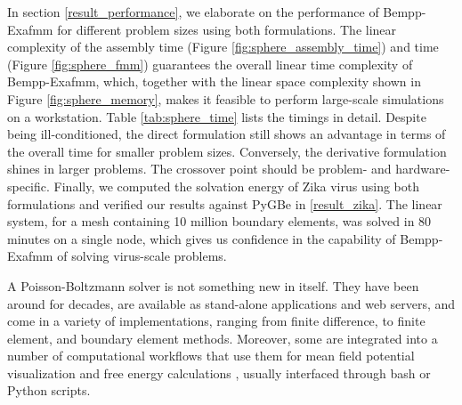 In section \ref{result_performance}, we elaborate on the performance of Bempp-Exafmm for different problem sizes using both formulations.
The linear complexity of the assembly time (Figure \ref{fig:sphere_assembly_time}) and \fmm time (Figure \ref{fig:sphere_fmm}) guarantees the overall linear time complexity of Bempp-Exafmm, which, together with the linear space complexity shown in Figure \ref{fig:sphere_memory}, makes it feasible to perform large-scale simulations on a workstation.
Table \ref{tab:sphere_time} lists the timings in detail.
Despite being ill-conditioned, the direct formulation still shows an advantage in terms of the overall time for smaller problem sizes.
Conversely, the derivative formulation shines in larger problems.
The crossover point should be problem- and hardware-specific.
Finally, we computed the solvation energy of Zika virus using both formulations and verified our results against PyGBe in \ref{result_zika}.
The linear system, for a mesh containing 10 million boundary elements, was solved in 80 minutes on a single node, which gives us confidence in the capability of Bempp-Exafmm of solving virus-scale problems.


A Poisson-Boltzmann solver is not something new in itself.
They have been around for decades, are available as stand-alone applications and web servers, and come in a variety of implementations, ranging from finite difference, to finite element, and boundary element methods.
Moreover, some are integrated into a number of computational workflows that use them for mean field potential visualization \cite{HumphreyETal1996} and free energy calculations \cite{MillerETal2012,KumariETal2014,WangETal2018}, usually interfaced through bash or Python scripts.

